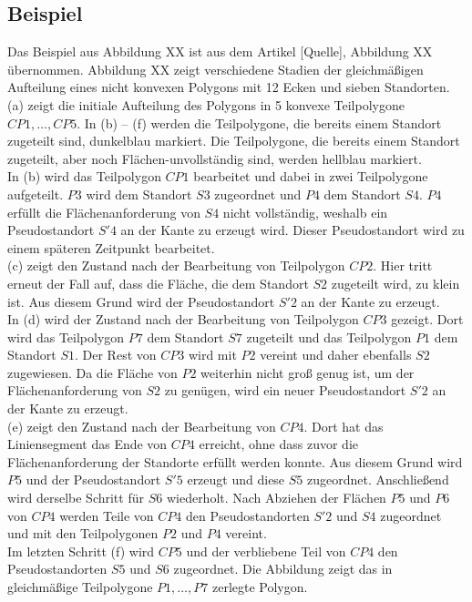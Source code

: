 \documentclass[ngerman]{seminarbeitrag}
\begin{document}
\subsection{Beispiel}\label{beispiel nicht konvex}
Das Beispiel aus Abbildung XX ist aus dem Artikel [Quelle], Abbildung XX übernommen.
Abbildung XX zeigt verschiedene Stadien der gleichmäßigen Aufteilung eines nicht konvexen Polygons mit 12 Ecken und sieben Standorten. (a) zeigt die initiale Aufteilung des Polygons in 5 konvexe Teilpolygone $CP1, …,CP5$. In (b) – (f) werden die Teilpolygone, die bereits einem Standort zugeteilt sind, dunkelblau markiert. Die Teilpolygone, die bereits einem Standort zugeteilt, aber noch Flächen-unvollständig sind, werden hellblau markiert.\\
In (b) wird das Teilpolygon $CP1$ bearbeitet und dabei in zwei Teilpolygone aufgeteilt. $P3$ wird dem Standort $S3$ zugeordnet und $P4$ dem Standort $S4$. $P4$ erfüllt die Flächenanforderung von $S4$ nicht vollständig, weshalb ein Pseudostandort $S'4$ an der Kante zu  erzeugt wird. Dieser Pseudostandort wird zu einem späteren Zeitpunkt bearbeitet.\\
 (c) zeigt den Zustand nach der Bearbeitung von Teilpolygon $CP2$. Hier tritt erneut der Fall auf, dass die Fläche, die dem Standort $S2$ zugeteilt wird, zu klein ist. Aus diesem Grund wird der Pseudostandort $S'2$ an der Kante zu  erzeugt.\\
In (d) wird der Zustand nach der Bearbeitung von Teilpolygon $CP3$ gezeigt. Dort wird das Teilpolygon $P7$ dem Standort $S7$ zugeteilt und das Teilpolygon $P1$ dem Standort $S1$. Der Rest von $CP3$ wird mit $P2$ vereint und daher ebenfalls $S2$ zugewiesen. Da die Fläche von $P2$ weiterhin nicht groß genug ist, um der Flächenanforderung von $S2$ zu genügen, wird ein neuer Pseudostandort $S'2$ an der Kante zu  erzeugt.\\
 (e) zeigt den Zustand nach der Bearbeitung von $CP4$. Dort hat das Liniensegment das Ende von $CP4$ erreicht, ohne dass zuvor die Flächenanforderung der Standorte erfüllt werden konnte. Aus diesem Grund wird $P5$ und der Pseudostandort $S'5$ erzeugt und diese $S5$ zugeordnet. Anschließend wird derselbe Schritt für $S6$ wiederholt. Nach Abziehen der Flächen $P5$ und $P6$ von $CP4$ werden Teile von $CP4$ den Pseudostandorten $S'2$ und $S4$ zugeordnet und mit den Teilpolygonen $P2$ und $P4$ vereint.\\
Im letzten Schritt (f) wird $CP5$ und der verbliebene Teil von $CP4$ den Pseudostandorten $S5$ und $S6$ zugeordnet. Die Abbildung zeigt das in gleichmäßige Teilpolygone $P1,…,P7$ zerlegte Polygon.
\end{document}
